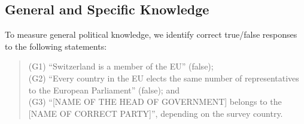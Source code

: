 \documentclass[11pt,halfline,a4paper,]{ouparticle}
\begin{document}
\begin{table}

\caption{\label{tab:tab1}Demographic details of the sample}
\centering
{}
\end{table}

\hypertarget{general-and-specific-knowledge}{%
\subsection{General and Specific
Knowledge}\label{general-and-specific-knowledge}}

To measure general political knowledge, we identify correct true/false
responses to the following statements:

\begin{quote}
(G1) ``Switzerland is a member of the EU'' (false);\\
(G2) ``Every country in the EU elects the same number of representatives
to the European Parliament'' (false); and\\
(G3) ``{[}NAME OF THE HEAD OF GOVERNMENT{]} belongs to the {[}NAME OF
CORRECT PARTY{]}'', depending on the survey country.
\end{quote}
\end{document}

